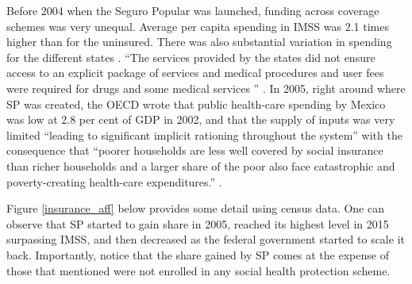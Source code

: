 \documentclass[oneside,11pt]{article}
\begin{document}
Before 2004 when the Seguro Popular was launched, funding across coverage schemes was very unequal. Average per capita spending in IMSS was 2.1 times higher than for the uninsured. There was also substantial variation in spending for the different states \citep{Lancet}.  ``The services provided by the states did not ensure access to an explicit  package of services and medical procedures and user fees were required for drugs and some medical services '' \citep{Azuara}. In 2005, right around where SP was created, the OECD wrote that public health-care spending by Mexico was low at 2.8 per cent of GDP in 2002, and that the supply of inputs was very limited ``leading to significant implicit rationing throughout the system'' with the consequence that ``poorer households are less well covered by social insurance than richer households and a larger share of the poor also face catastrophic and poverty-creating health-care expenditures.''  \cite{OECD}. 

Figure \ref{insurance_aff} below provides some detail using census data. One can observe that SP started to gain share in 2005, reached its highest level in 2015 surpassing IMSS, and then decreased as the federal government started to scale it back. Importantly, notice that the share gained by SP comes at the expense of those that mentioned were not enrolled in any social health protection scheme.   
\end{document}
